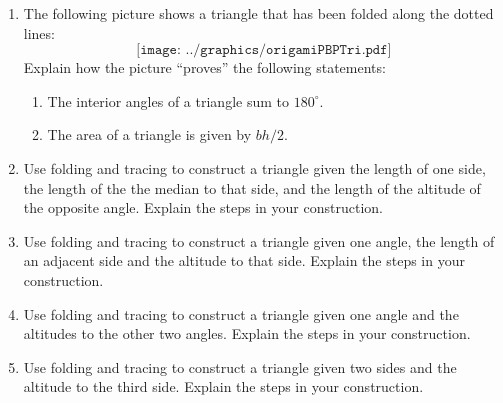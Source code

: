 \begin{problems}
\begin{enumerate}
\item The following picture shows a triangle that has been folded
  along the dotted lines:
\[
\texttt{[image: ../graphics/origamiPBPTri.pdf]}
\]
Explain how the picture ``proves'' the following statements:
\begin{enumerate}
\item The interior angles of a triangle sum to $180^\circ$. 
\item The area of a triangle is given by $bh/2$. 
\end{enumerate}
\item Use folding and tracing to construct a triangle given the length of one
  side, the length of the the median to that side, and the length of
  the altitude of the opposite angle. Explain the steps in your
  construction.
\item Use folding and tracing to construct a triangle given one angle, the length
  of an adjacent side and the altitude to that side. Explain the steps
  in your construction.
\item Use folding and tracing to construct a triangle given one angle and the
  altitudes to the other two angles. Explain the steps in your
  construction.
\item Use folding and tracing to construct a triangle given two sides and the
  altitude to the third side. Explain the steps in your construction.
\end{enumerate}
\end{problems}


